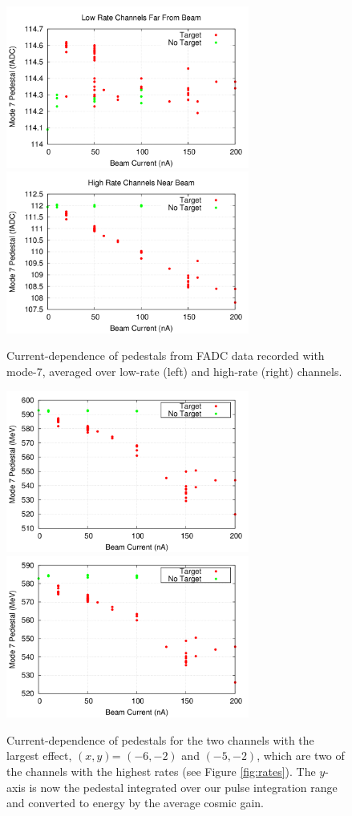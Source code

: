 \documentclass[amsmath,amssymb,notitlepage,12pt]{revtex4-1}
\begin{document}
\begin{figure}[htbp]\centering
    \includegraphics[width=8cm]{pics/ped_vs_current_low.png}
    \includegraphics[width=8cm]{pics/ped_vs_current_high.png}
    \caption{Current-dependence of pedestals from FADC data recorded with mode-7, averaged over low-rate (left) and high-rate (right) channels.\label{fig:pedvscur}}
\end{figure}


\begin{figure}[htbp]\centering
    \includegraphics[width=8cm]{pics/pvsc_17_03_mev.png}
    \includegraphics[width=8cm]{pics/pvsc_18_03_mev.png}
    \caption{Current-dependence of pedestals for the two channels with the largest effect, $(x,y)$= $(-6,-2)$ and $(-5,-2)$, which are two of the channels with the highest rates (see Figure \ref{fig:rates}).  The $y$-axis is now the pedestal integrated over our pulse integration range and converted to energy by the average cosmic gain.\label{fig:pedvscur2}}
\end{figure}
\end{document}
